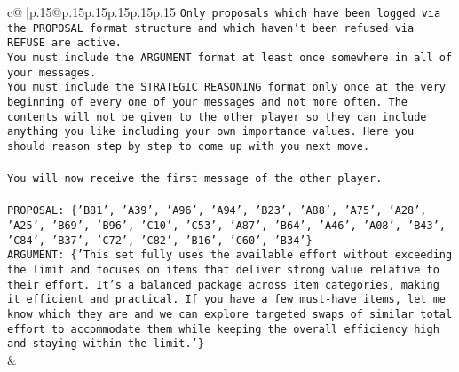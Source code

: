 \documentclass{article}
\begin{document}
{\begin{supertabular}{c@{$\;$}|p{.15\linewidth}@{}p{.15\linewidth}p{.15\linewidth}p{.15\linewidth}p{.15\linewidth}p{.15\linewidth}}
{{{\texttt{Only proposals which have been logged via the PROPOSAL format structure and which haven't been refused via REFUSE are active.} \\
\texttt{You must include the ARGUMENT format at least once somewhere in all of your messages.} \\
\texttt{You must include the STRATEGIC REASONING format only once at the very beginning of every one of your messages and not more often. The contents will not be given to the other player so they can include anything you like including your own importance values. Here you should reason step by step to come up with you next move.} \\
\\ 
\texttt{You will now receive the first message of the other player.} \\
\\ 
\texttt{PROPOSAL: \{'B81', 'A39', 'A96', 'A94', 'B23', 'A88', 'A75', 'A28', 'A25', 'B69', 'B96', 'C10', 'C53', 'A87', 'B64', 'A46', 'A08', 'B43', 'C84', 'B37', 'C72', 'C82', 'B16', 'C60', 'B34'\}} \\
\texttt{ARGUMENT: \{'This set fully uses the available effort without exceeding the limit and focuses on items that deliver strong value relative to their effort. It’s a balanced package across item categories, making it efficient and practical. If you have a few must{-}have items, let me know which they are and we can explore targeted swaps of similar total effort to accommodate them while keeping the overall efficiency high and staying within the limit.'\}} \\
            }
        }
    }
    & \\ \\


\end{supertabular}}
\end{document}
